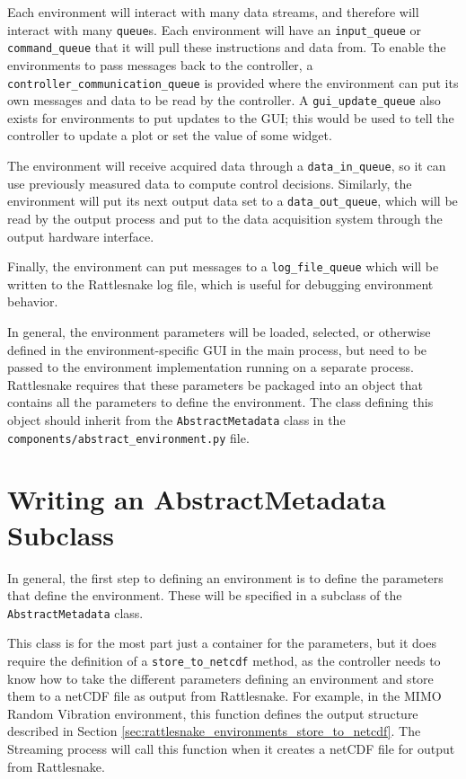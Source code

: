 \documentclass[pdf,12pt,report]{SANDreport}
\newcommand{\inlineCode}{\lstinline[basicstyle=\bfseries\ttfamily]}
\begin{document}
    Each environment will interact with many data streams, and therefore will interact with many \inlineCode{queue}s.  Each environment will have an \inlineCode{input_queue} or \inlineCode{command_queue} that it will pull these instructions and data from.  To enable the environments to pass messages back to the controller, a \inlineCode{controller_communication_queue} is provided where the environment can put its own messages and data to be read by the controller.  A \inlineCode{gui_update_queue} also exists for environments to put updates to the \ac{GUI}; this would be used to tell the controller to update a plot or set the value of some widget.
    
    The environment will receive acquired data through a \inlineCode{data_in_queue}, so it can use previously measured data to compute control decisions.  Similarly, the environment will put its next output data set to a \inlineCode{data_out_queue}, which will be read by the output process and put to the data acquisition system through the output hardware interface.
    
    Finally, the environment can put messages to a \inlineCode{log_file_queue} which will be written to the Rattlesnake log file, which is useful for debugging environment behavior.
    
    In general, the environment parameters will be loaded, selected, or otherwise defined in the environment-specific \ac{GUI} in the main process, but need to be passed to the environment implementation running on a separate process.  Rattlesnake requires that these parameters be packaged into an object that contains all the parameters to define the environment.  The class defining this object should inherit from the \inlineCode{AbstractMetadata} class in the \inlineCode{components/abstract_environment.py} file.
    
    \section{Writing an AbstractMetadata Subclass}
    In general, the first step to defining an environment is to define the parameters that define the environment.  These will be specified in a subclass of the \inlineCode{AbstractMetadata} class.
    
    This class is for the most part just a container for the parameters, but it does require the definition of a \inlineCode{store_to_netcdf} method, as the controller needs to know how to take the different parameters defining an environment and store them to a netCDF file as output from Rattlesnake.  For example, in the \Ac{MIMO} Random Vibration environment, this function defines the output structure described in Section \ref{sec:rattlesnake_environments_store_to_netcdf}.  The Streaming process will call this function when it creates a netCDF file for output from Rattlesnake.
    
\end{document}
